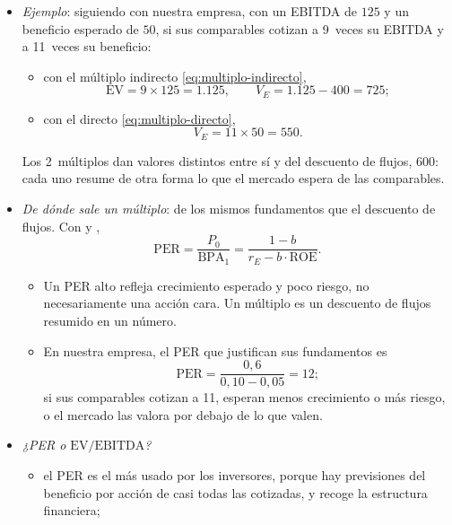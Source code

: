 \documentclass[11pt]{article}
\begin{document}
\begin{itemize}
\begin{itemize}
    \begin{equation}\label{eq:multiplo-directo}
    V_E=\mathrm{PER}_{\text{comparables}}\times\text{beneficio neto},\qquad \mathrm{PER}=\frac{P}{\mathrm{BPA}}.
    \end{equation}
    \begin{itemize}
    \item El PER dice cuántas veces el beneficio por acción paga el mercado por una acción; sirve también para valorar una empresa que no cotiza con el de una comparable que sí lo hace.
    \item Igual con el precio entre el valor contable y con la rentabilidad por dividendo.
    \end{itemize}
  \end{itemize}
\item \emph{Ejemplo}: siguiendo con nuestra empresa, con un EBITDA de $125$ y un beneficio esperado de $50$, si sus comparables cotizan a 9~veces su EBITDA y a 11~veces su beneficio:
  \begin{itemize}
  \item con el múltiplo indirecto \eqref{eq:multiplo-indirecto},
  \[
  \mathrm{EV}=9\times125=1.125,\qquad V_E=1.125-400=725;
  \]
  \item con el directo \eqref{eq:multiplo-directo},
  \[
  V_E=11\times50=550.
  \]
  \end{itemize}
  Los 2~múltiplos dan valores distintos entre sí y del descuento de flujos, $600$: cada uno resume de otra forma lo que el mercado espera de las comparables.
\item \emph{De dónde sale un múltiplo}: de los mismos fundamentos que el descuento de flujos. Con  y ,
  \[
  \mathrm{PER}=\frac{P_0}{\mathrm{BPA}_1}=\frac{1-b}{r_E-b\cdot\mathrm{ROE}}.
  \]
  \begin{itemize}
  \item Un PER alto refleja crecimiento esperado y poco riesgo, no necesariamente una acción cara. Un múltiplo es un descuento de flujos resumido en un número.
  \item En nuestra empresa, el PER que justifican sus fundamentos es
  \[
  \mathrm{PER}=\frac{0{,}6}{0{,}10-0{,}05}=12;
  \]
  si sus comparables cotizan a 11, esperan menos crecimiento o más riesgo, o el mercado las valora por debajo de lo que valen.
  \end{itemize}
\item \emph{¿PER o $\mathrm{EV}/\mathrm{EBITDA}$?}
  \begin{itemize}
  \item el PER es el más usado por los inversores, porque hay previsiones del beneficio por acción de casi todas las cotizadas, y recoge la estructura financiera;

\end{itemize}
\end{itemize}
\end{document}
